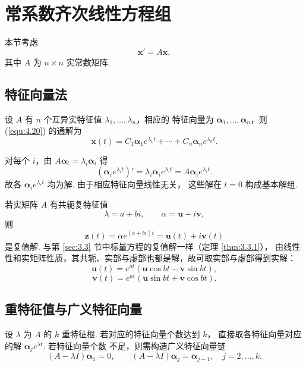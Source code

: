 \section{常系数齐次线性方程组}\label{sec:4.4}

本节考虑
\begin{equation}\label{equ:4.20}
\bm{x}'=A\bm{x},
\end{equation}
其中 $A$ 为 $n\times n$ 实常数矩阵.

\subsection{特征向量法}

\begin{thm}\label{thm:4.4.1}
设 $A$ 有 $n$ 个互异实特征值 $\lambda_1,\ldots,\lambda_n$，相应的
特征向量为 $\bm{\alpha}_1,\ldots,\bm{\alpha}_n$，则
(\ref{equ:4.20}) 的通解为
\begin{equation}\label{equ:4.21}
\bm{x}(t)=C_1\bm{\alpha}_1e^{\lambda_1t}
+\cdots+C_n\bm{\alpha}_ne^{\lambda_nt}.
\end{equation}
\end{thm}

\begin{pf1}
对每个 $i$，由 $A\bm{\alpha}_i=\lambda_i\bm{\alpha}_i$ 得
\[
\left(\bm{\alpha}_ie^{\lambda_it}\right)'
=\lambda_i\bm{\alpha}_ie^{\lambda_it}
=A\bm{\alpha}_ie^{\lambda_it}.
\]
故各 $\bm{\alpha}_ie^{\lambda_it}$ 均为解. 由于相应特征向量线性无关，
这些解在 $t=0$ 构成基本解组.
\end{pf1}

若实矩阵 $A$ 有共轭复特征值
\[
\lambda=a+bi,\qquad \alpha=\bm{u}+i\bm{v},
\]
则
\[
\bm{z}(t)
=\alpha e^{(a+bi)t}
=\bm{u}(t)+i\bm{v}(t)
\]
是复值解. 与第 \ref{sec:3.3} 节中标量方程的复值解一样（定理 \ref{thm:3.3.1}），
由线性性和实矩阵性质，其共轭、实部与虚部也都是解，故可取实部与虚部得到实解：
\begin{equation}\label{equ:4.22}
\bm{u}(t)
=e^{at}\left(\bm{u}\cos bt-\bm{v}\sin bt\right),
\end{equation}
\begin{equation}\label{equ:4.23}
\bm{v}(t)
=e^{at}\left(\bm{u}\sin bt+\bm{v}\cos bt\right).
\end{equation}

\subsection{重特征值与广义特征向量}

设 $\lambda$ 为 $A$ 的 $k$ 重特征根. 若对应的特征向量个数达到 $k$，
直接取各特征向量对应的解 $\bm{\alpha}_je^{\lambda t}$. 若特征向量个数
不足，则需构造广义特征向量链
\begin{equation}\label{equ:4.24}
(A-\lambda I)\bm{\alpha}_1=0,
\qquad
(A-\lambda I)\bm{\alpha}_j=\bm{\alpha}_{j-1},
\quad j=2,\ldots,k.
\end{equation}

